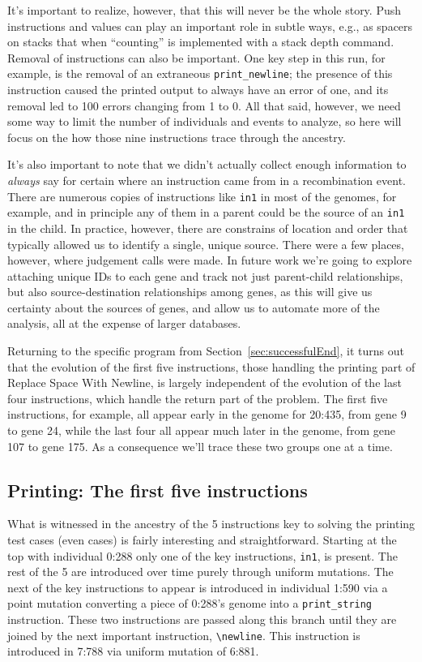 It's important to realize, however, that this will
never be the whole story. Push instructions and values can play an 
important role in subtle ways, e.g., as spacers on stacks that when
``counting'' is implemented with a stack depth command. Removal of
instructions can also be important. One key step in this run, for example, 
is the removal of an extraneous \texttt{print\_newline}; the presence of this
instruction caused the printed output to always have an error of one,
and its removal led to 100 errors changing
from 1 to 0. All that said, however, we need some way to limit the number
of individuals and events to analyze, so here will focus on the how those
nine instructions trace through the ancestry.

It's also important to note that we didn't actually collect enough information
to \emph{always} say for certain where an instruction came from in a 
recombination event. There are numerous copies of instructions like
\texttt{in1} in most of the genomes, for example, and in principle any of them
in a parent could be the source of an \texttt{in1} in the child. In practice,
however, there are constrains of location and order that typically allowed
us to identify a single, unique source. There were a few places, however, where
judgement calls were made. In future work we're going to explore attaching
unique IDs to each gene and track not just parent-child relationships, but
also source-destination relationships among genes, as this will give us
certainty about the sources of genes, and allow us to automate more of the
analysis, all at the expense of larger databases.

Returning to the specific program from Section~\ref{sec:successfulEnd},
it turns
out that the evolution of the first five instructions, those handling the
printing part of Replace Space With Newline, is largely independent of
the evolution of the last four instructions, which handle the return part
of the problem. The first five instructions, for example, all appear early 
in the genome for 20:435, from gene 9 to gene 24, while the last four 
all appear much later in the genome, from gene 107 to gene 175. As a consequence
we'll trace these two groups one at a time.

\subsection{Printing: The first five instructions}
\label{sec:Printing}

What is witnessed in the ancestry of the 5 instructions key to solving the printing test
cases (even cases) is fairly interesting and straightforward. Starting at the top with individual 0:288 only
one of the key instructions, \texttt{in1}, is present. The rest of the 5 are introduced over time purely
through uniform mutations. The next of the key instructions to appear is introduced in individual 1:590 via a point
mutation converting a piece of 0:288's genome into a \texttt{print\_string} instruction. These two
instructions are passed along this branch until they are joined by the next important instruction,
\texttt{\textbackslash newline}. This instruction is introduced in 7:788 via uniform mutation
of 6:881.

